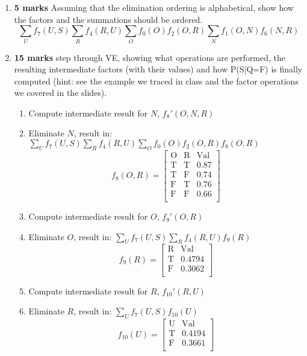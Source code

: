 \documentclass{article}
\def\ans#1{{\color{ans}#1}}
\newcommand{\mat}[1]{\begin{bmatrix}#1\end{bmatrix}}
\begin{document}
\begin{enumerate}[label=\arabic*.]
    \item \textbf{5 marks} Assuming that the elimination ordering is alphabetical, show how the factors and the summations should be ordered. \\
    \ans{
        \[ \sum_U f_7(U,S) \sum_R f_4(R,U) \sum_O f_0(O) f_2(O,R) \sum_N f_1(O,N) f_6(N,R)\]
    }
    \item \textbf{15 marks} step through VE, showing what operations are performed, the resulting intermediate factors (with their values) and how P(S|Q=F) is finally computed (hint: see the example we traced in class and the factor operations we covered in the slides).
    \ans{
        \begin{enumerate}[label=\arabic*.]
            \item Compute intermediate result for $N$, $f_8'(O,N,R)$
            \item Eliminate $N$, result in: $\sum_U f_7(U,S) \sum_R f_4(R,U) \sum_O f_0(O) f_2(O,R) f_8(O,R)$
            \[
                f_8(O,R) = \mat{
                    \text{O} & \text{R} & \text{Val} \\
                    \text{T} & \text{T} & 0.87 \\
                    \text{T} & \text{F} & 0.74 \\
                    \text{F} & \text{T} & 0.76 \\
                    \text{F} & \text{F} & 0.66 \\
                }
            \]
            \item Compute intermediate result for $O$, $f_9'(O,R)$
            \item Eliminate $O$, result in: $\sum_U f_7(U,S) \sum_R f_4(R,U) f_9(R)$
            \[
                f_9(R) = \mat{
                    \text{R} & \text{Val} \\
                    \text{T} & 0.4794 \\
                    \text{F} & 0.3062 \\
                }
            \]
            \item Compute intermediate result for $R$, $f_{10}'(R,U)$
            \item Eliminate $R$, result in: $\sum_U f_7(U,S) f_{10}(U)$
            \[
                f_{10}(U) = \mat{
                    \text{U} & \text{Val} \\
                    \text{T} & 0.4194 \\
                    \text{F} & 0.3661 \\
}\]
\end{enumerate}}
\end{enumerate}
\end{document}
